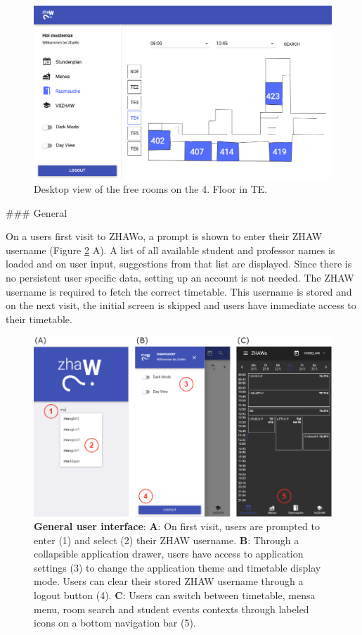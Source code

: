 \begin{markdown}
\begin{figure}[H]
  \includegraphics[width=13.5cm, center]{./figures/desktop_roomsearch.png}
  \captionsetup{width=15.5cm}
  \caption[Desktop Roomsearch]{Desktop view of the free rooms on the 4. Floor in TE.}
  \label{fig:DesktopRoomsearch}
\end{figure}

### General

On a users first visit to ZHAWo, a prompt is shown to enter their ZHAW username (Figure \ref{fig:LoginFigure} A). A list of all available student and professor names is loaded and on user input, suggestions from that list are displayed. Since there is no persistent user specific data, setting up an account is not needed. The ZHAW username is required to fetch the correct timetable. This username is stored and on the next visit, the initial screen is skipped and users have immediate access to their timetable.

\begin{figure}[H]
  \includegraphics[width=16cm, center]{./figures/login_figure.png}
  \captionsetup{width=15.5cm}
  \caption[General user interface]{\textbf{General user interface}: \textbf{A}: On first visit, users are prompted to enter (1) and select (2) their ZHAW username. \textbf{B}: Through a collapsible application drawer, users have access to application settings (3) to change the application theme and timetable display mode. Users can clear their stored ZHAW username through a logout button (4). \textbf{C}: Users can switch between timetable, mensa menu, room search and student events contexts through labeled icons on a bottom navigation bar (5).}
  \label{fig:LoginFigure}
\end{figure}


\end{markdown}
